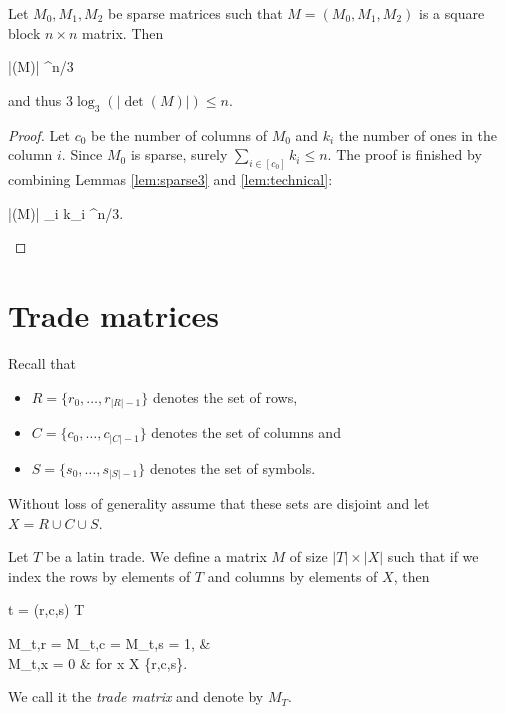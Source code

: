 \begin{lem}
Let $M_0,M_1,M_2$ be sparse matrices such that $M = (M_0,M_1,M_2)$ is a  square block $n \times n$ matrix. Then
\begin{cosyeqnarray}
 	|\det(M)| ^{n/3}
\end{cosyeqnarray}%
and thus $3 \log_3(|\det(M)|) \leq n$.
\end{lem}
\begin{proof}
Let $c_0$ be the number of columns of $M_0$ and $k_i$ the number of ones in the column $i$. Since $M_0$ is sparse, surely $\sum_{i \in [c_0]} k_i \leq n$. The proof is finished by combining Lemmas \ref{lem:sparse3} and \ref{lem:technical}:
\begin{cosyeqnarray}
	|\det(M)| \leq \prod_{i \in [c_0]} k_i ^{n/3}.
\end{cosyeqnarray}%
\end{proof}

\section{Trade matrices}
Recall that
\begin{itemize}
	\item $R = \{r_0,\dots,r_{|R|-1}\}$ denotes the set of rows,
	\item $C = \{c_0,\dots,c_{|C|-1}\}$ denotes the set of columns and
	\item $S = \{s_0,\dots,s_{|S|-1}\}$ denotes the set of symbols.
\end{itemize}
Without loss of generality assume that these sets are disjoint and let $X = R \cup C \cup S$.

\begin{defn}
Let $T$ be a latin trade. We define a matrix $M$ of size $|T| \times |X|$ such that if we index the rows by elements of $T$ and columns by elements of $X$, then
\begin{cosyeqnarray}
	t = (r,c,s) \in T \Rightarrow
	\begin{cases}
		M_{t,r} = M_{t,c} = M_{t,s} = 1, & \\
		M_{t,x} = 0 & \textrm{ for } x \in X \setminus \{r,c,s\}.
	\end{cases}
\end{cosyeqnarray}%
\end{defn}
We call it the \emph{trade matrix} and denote by $M_T$.

